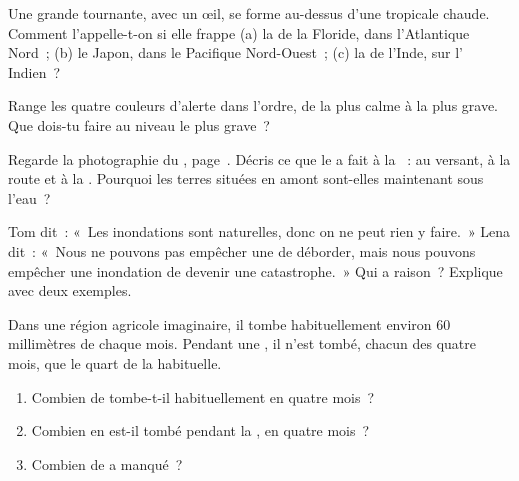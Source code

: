 \begin{exercise}[$\star$]\label{exo:g5:natural-hazards:5}
Une grande  tournante, avec un œil, se forme au-dessus d'une 
tropicale chaude. Comment l'appelle-t-on si elle frappe (a) la  de la
Floride, dans l'Atlantique Nord~; (b) le Japon, dans le Pacifique
Nord-Ouest~; (c) la  de l'Inde, sur l' Indien~?
\end{exercise}

\begin{exercise}[$\star$]\label{exo:g5:natural-hazards:6}
Range les quatre couleurs d'alerte dans l'ordre, de la plus calme à la plus
grave. Que dois-tu faire au niveau le plus grave~?
\end{exercise}

\begin{exercise}[$\star\star$]\label{exo:g5:natural-hazards:7}
Regarde la photographie du ,
page~\pageref{fig:g5:natural-hazards:landslide}. Décris ce que le
 a fait à la ~: au versant, à la route et à la
. Pourquoi les terres situées en amont sont-elles maintenant sous
l'eau~?
\end{exercise}

\begin{exercise}[$\star\star$]\label{exo:g5:natural-hazards:8}
Tom dit~: «~Les inondations sont naturelles, donc on ne peut rien y
faire.~» Lena dit~: «~Nous ne pouvons pas empêcher une  de déborder,
mais nous pouvons empêcher une inondation de devenir une catastrophe.~»
Qui a raison~? Explique avec deux exemples.
\end{exercise}

\begin{exercise}[$\star\star$]\label{exo:g5:natural-hazards:9}
Dans une région agricole imaginaire, il tombe habituellement environ
60 millimètres de  chaque mois. Pendant une , il n'est
tombé, chacun des quatre mois, que le quart de la  habituelle.
\begin{enumerate}
  \item[(a)] Combien de  tombe-t-il habituellement en quatre mois~?
  \item[(b)] Combien en est-il tombé pendant la , en quatre mois~?
  \item[(c)] Combien de  a manqué~?
\end{enumerate}
\end{exercise}

